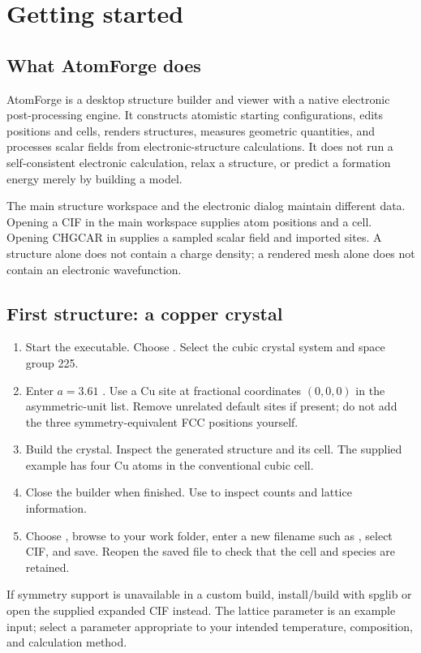 \chapter{Getting started}\label{ch:start}
\section{What AtomForge does}
AtomForge is a desktop structure builder and viewer with a native electronic post-processing engine. It constructs atomistic starting configurations, edits positions and cells, renders structures, measures geometric quantities, and processes scalar fields from electronic-structure calculations. It does not run a self-consistent electronic calculation, relax a structure, or predict a formation energy merely by building a model.

The main structure workspace and the electronic dialog maintain different data. Opening a CIF in the main workspace supplies atom positions and a cell. Opening CHGCAR in  supplies a sampled scalar field and imported sites. A structure alone does not contain a charge density; a rendered mesh alone does not contain an electronic wavefunction.

\section{First structure: a copper crystal}
\begin{enumerate}
\item Start the executable. Choose . Select the cubic crystal system and space group 225.
\item Enter $a=3.61$ \angstrom. Use a Cu site at fractional coordinates $(0,0,0)$ in the asymmetric-unit list. Remove unrelated default sites if present; do not add the three symmetry-equivalent FCC positions yourself.
\item Build the crystal. Inspect the generated structure and its cell. The supplied example  has four Cu atoms in the conventional cubic cell.
\item Close the builder when finished. Use  to inspect counts and lattice information.
\item Choose , browse to your work folder, enter a new filename such as , select CIF, and save. Reopen the saved file to check that the cell and species are retained.
\end{enumerate}
If symmetry support is unavailable in a custom build, install/build with spglib or open the supplied expanded CIF instead. The lattice parameter is an example input; select a parameter appropriate to your intended temperature, composition, and calculation method.

